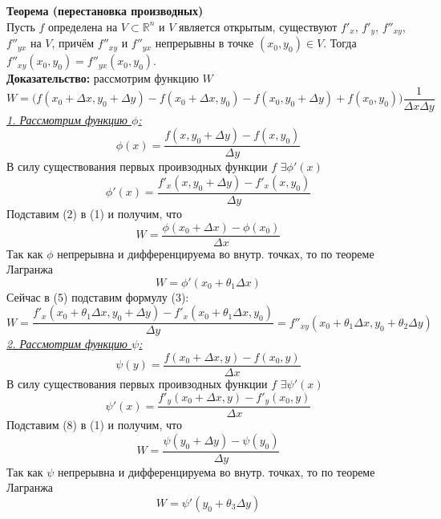 \documentclass[book, 11pt]{report}
\begin{document}
        \par{\textbf{Теорема (перестановка производных)}\\
        Пусть $f$ определена на $V\subset\mathbb{R}^n$ и $V$ является открытым, существуют $f'_x$, $f'_y$, $f''_{xy}$, $f''_{yx}$ на $V$, причём $f''_{xy}$ и $f''_{yx}$ непрерывны в точке $(x_0,y_0)\in V$. Тогда $f''_{xy}(x_0,y_0)=f''_{yx}(x_0,y_0)$. \\
        \textbf{Доказательство: } рассмотрим функцию $W$
        \begin{equation}
            W=\bigg(f(x_0+\Delta x,y_0+\Delta y)-f(x_0+\Delta x,y_0)-f(x_0,y_0+\Delta y)+f(x_0,y_0)\bigg)\frac{1}{\Delta x\Delta y}
        \end{equation}
        \underline{\textit{1. Рассмотрим функцию $\phi$:}}
        \begin{equation}
            \phi(x)=\frac{f(x,y_0+\Delta y)-f(x,y_0)}{\Delta y}
        \end{equation}
        В силу существования первых проивзодных функции $f$ $\exists\phi'(x)$
        \begin{equation}
            \phi'(x)=\frac{f'_x(x,y_0+\Delta y)-f'_x(x,y_0)}{\Delta y}
        \end{equation}
        Подставим (2) в (1) и получим, что
        \begin{equation}
            W=\frac{\phi(x_0+\Delta x)-\phi(x_0)}{\Delta x}
        \end{equation}
        Так как $\phi$ непрерывна и дифференцируема во внутр. точках, то по теореме Лагранжа
        \begin{equation}
            W=\phi'(x_0+\theta_1\Delta x)
        \end{equation}
        Сейчас в (5) подставим формулу (3):
        \begin{equation}
            W=\frac{f'_x(x_0+\theta_1\Delta x,y_0+\Delta y)-f'_x(x_0+\theta_1\Delta x,y_0)}{\Delta y}=f''_{xy}(x_0+\theta_1\Delta x,y_0+\theta_2\Delta y)
        \end{equation}
        \underline{\textit{2. Рассмотрим функцию $\psi$:}}
        \begin{equation}
            \psi(y)=\frac{f(x_0+\Delta x, y)-f(x_0,y)}{\Delta x}
        \end{equation}
        В силу существования первых проивзодных функции $f$ $\exists\psi'(x)$
        \begin{equation}
            \psi'(x)=\frac{f'_y(x_0+\Delta x, y)-f'_y(x_0,y)}{\Delta x}
        \end{equation}
        Подставим (8) в (1) и получим, что
        \begin{equation}
            W=\frac{\psi(y_0+\Delta y)-\psi(y_0)}{\Delta y}
        \end{equation}
        Так как $\psi$ непрерывна и дифференцируема во внутр. точках, то по теореме Лагранжа
        \begin{equation}
            W=\psi'(y_0+\theta_3\Delta y)
        \end{equation}
        }
\end{document}
